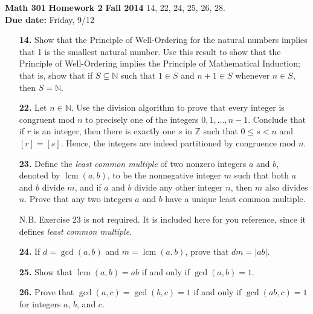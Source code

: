 \documentclass[12pt,reqno]{amsart}
\renewcommand{\subset}{\ensuremath{\subsetneq}}
\newcommand{\boldemph}{\emph}
\newcommand{\lcm}{\operatorname{lcm}}
\begin{document}
\thispagestyle{empty}

\noindent \textbf{Math 301} \hskip5cm {\bf Homework 2} \hfill {\bf Fall 2014}
\vskip1cm
  14, 22, 24, 25, 26, 28.  \\
{\bf Due date:} Friday, 9/12

\medskip

\begin{enumerate}

\item[{\bf 14.}]
Show that the Principle of Well-Ordering for the natural numbers implies that 1 is the smallest natural number.  Use this result to show that the Principle of Well-Ordering implies the Principle of Mathematical Induction; that is, show that if $S \subset {\mathbb N}$ such that $1 \in S$ and $n + 1 \in S$ whenever $n \in S$, then $S = {\mathbb N}$.  

\item[{\bf 22.}]
Let $n \in {\mathbb N}$.  Use the division algorithm to prove that every integer is congruent mod $n$ to precisely one of the integers $0, 1, \ldots, n-1$.  Conclude that if $r$ is an integer, then there is exactly one $s$ in ${\mathbb Z}$ such that $0 \leq s < n$ and $[r] = [s]$.   Hence, the integers are indeed partitioned by congruence mod $n$. 

\item[{\bf 23.}]
Define the \boldemph{least common multiple} of two nonzero integers $a$ and $b$, denoted by $\lcm(a,b)$\label{leastcm}, to be the nonnegative integer $m$ such that both $a$ and $b$ divide $m$, and if $a$ and $b$  divide any other integer $n$, then $m$ also divides $n$.  Prove that any two integers $a$ and $b$ have a unique least common multiple. 

N.B. Exercise 23 is not required. It is included here for you reference, since it defines \emph{least common multiple}.

\item[{\bf 24.}]
If $d= \gcd(a, b)$ and $m = \lcm(a, b)$, prove that $dm = |ab|$.

\item[{\bf 25.}]
Show that $\lcm(a,b) = ab$ if and only if $\gcd(a,b) = 1$.

\item[{\bf 26.}]
Prove that $\gcd(a,c) = \gcd(b,c) =1$ if and only if $\gcd(ab,c) = 1$ for integers $a$, $b$, and $c$.


\end{enumerate}
\end{document}
